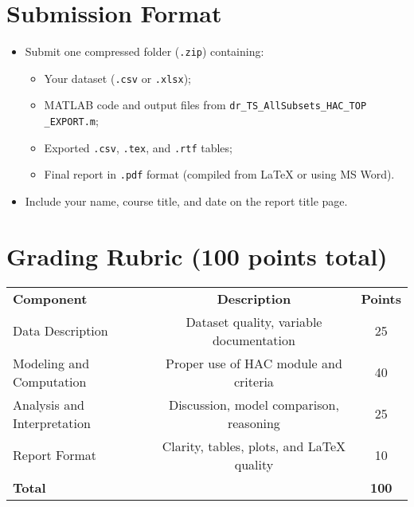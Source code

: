 \documentclass[12pt,thmsa]{article}
\begin{document}
\vspace{1pt}

\section*{Submission Format}

\vspace{1pt}

\begin{itemize}
\item Submit one compressed folder (\texttt{.zip}) containing:

\begin{itemize}
\item Your dataset (\texttt{.csv} or \texttt{.xlsx});

\item MATLAB code and output files from \texttt{dr\_TS\_AllSubsets\_HAC\_TOP%
\_EXPORT.m};

\item Exported \texttt{.csv}, \texttt{.tex}, and \texttt{.rtf} tables;

\item Final report in \texttt{.pdf} format (compiled from LaTeX or using MS
Word).
\end{itemize}
\end{itemize}

\vspace{1pt}

\begin{itemize}
\item Include your name, course title, and date on the report title page.
\end{itemize}

\vspace{1pt}

\section*{Grading Rubric (100 points total)}

\vspace{1pt}

\begin{tabular}{lcc}
\textbf{Component} & \textbf{Description} & \textbf{Points} \\ 
Data Description & Dataset quality, variable documentation & 25 \\ 
Modeling and Computation & Proper use of HAC module and criteria & 40 \\ 
Analysis and Interpretation & Discussion, model comparison, reasoning & 25
\\ 
Report Format & Clarity, tables, plots, and LaTeX quality & 10 \\ 
\textbf{Total} &  & \textbf{100}%
\end{tabular}
\end{document}
